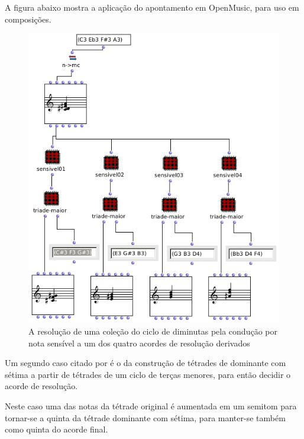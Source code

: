 \documentclass[
	12pt,				%
	openright,			%
	twoside,			%
	a4paper,			%
	english,			%
	french,				%
	spanish,			%
	brazil				%
	]{abntex2}
\begin{document}
A figura abaixo mostra a aplicação do apontamento em OpenMusic, para uso em composições.
 

\begin{figure}[!h]
	\caption{\label{fig_grafico}A resolução de uma coleção do ciclo de diminutas pela condução por nota sensível a um dos quatro acordes de resolução derivados   }
	\begin{center}
	    \includegraphics[scale=0.6]{ciclos/sensivel.png}
	\end{center}
\end{figure}


Um segundo caso citado por  é o da construção de tétrades de dominante com sétima a partir de tétrades de um ciclo de terças menores, para então decidir o acorde de resolução. 

Neste caso uma das notas da tétrade original é aumentada em um semitom para tornar-se a quinta da tétrade dominante com sétima, para manter-se também como quinta do acorde final.
\end{document}
